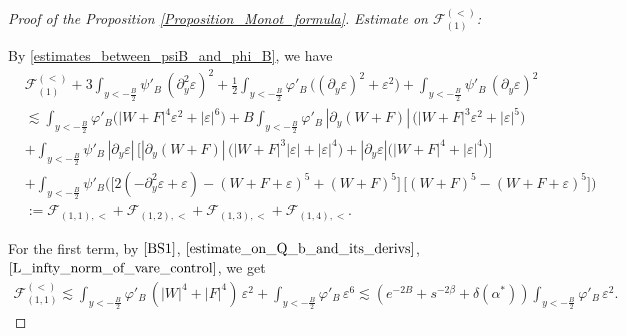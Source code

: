 \documentclass[16pt,english, oneside,reqno]{smfart}
\newcommand{\vare}{{\varepsilon}}
\newcommand{\vphi}{{\varphi}}
\begin{document}
\begin{proof}[Proof of the Proposition \ref{Proposition_Monot_formula}]
\textit{Estimate on $\mathcal{F}_{(1)}^{(<)}$:}

By \eqref{estimates_between_psiB_and_phi_B}, we have
\begin{equation}
    \begin{split}
        & \mathcal{F}_{(1)}^{(<)} + 3 \int_{y<-\frac B2} \psi'_B \,(\partial^2_y \vare)^2 + \frac{1}{2}\int_{y<-\frac B2} \vphi'_B\, \big( (\partial_y \vare)^2 + \vare^2\big)  + \int_{y<-\frac B2} \psi'_B \, (\partial_y \vare)^2\\
        & \lesssim \int_{y < -\frac{B}{2}} \vphi'_B \big( |W+F|^4 \vare^2 + |\vare|^6 \big) + B \int_{y<-\frac B2} \vphi'_B \, |\partial_y (W+F)|\, \big( |W+F|^3 \vare^2 + |\vare|^5\big)\\
        & + \int_{y<-\frac B2} \psi'_B \, |\partial_y \vare|\, \Big[ |\partial_y (W+F)|\, \big( |W+F|^3 |\vare| + |\vare|^4 \big) + |\partial_y \vare|\big( |W+F|^4 + |\vare|^4 \big)\Big]\\
        & +\int_{y<-\frac B2} \psi'_B \Big( \big[2(-\partial^2_y \vare + \vare) - (W+F+\vare)^5 + (W+F)^5\big]\, \big[ (W+F)^5 - (W+F+\vare)^5 \big] \Big)\\
        & := \mathcal{F}_{(1,1),<} +\mathcal{F}_{(1,2),<} +\mathcal{F}_{(1,3),<} +\mathcal{F}_{(1,4),<}.
    \end{split}
\end{equation}

For the first term, by $\eqref{BS1}$, $\eqref{estimate_on_Q_b_and_its_derivs}$, $\eqref{L_infty_norm_of_vare_control}$, we get
\begin{equation}
\begin{split}
    \mathcal{F}_{(1,1)}^{(<)}  \lesssim \int_{y<-\frac B2} \vphi'_B \,(|W|^4 + |F|^4)\, \vare^2 + \int_{y<-\frac B2} \vphi'_B \,\vare^6 \lesssim (e^{-2B} + s^{-2\beta}+\delta(\alpha^*))\int_{y<-\frac B2} \vphi'_B\,\vare^2.
\end{split}
\end{equation}


\end{proof}
\end{document}
